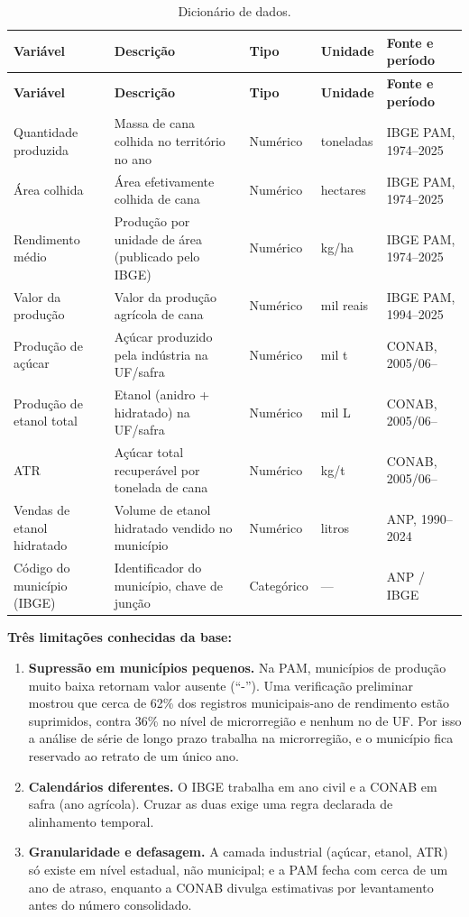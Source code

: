 \documentclass[11pt,a4paper]{article}
\begin{document}
\begin{longtable}{L{3.4cm} L{5.4cm} L{1.8cm} L{2.0cm} L{2.4cm}}
\caption{Dicionário de dados.}\label{tab:dicionario}\\
\toprule
\textbf{Variável} & \textbf{Descrição} & \textbf{Tipo} & \textbf{Unidade} & \textbf{Fonte e período}\\
\midrule
\endfirsthead
\toprule
\textbf{Variável} & \textbf{Descrição} & \textbf{Tipo} & \textbf{Unidade} & \textbf{Fonte e período}\\
\midrule
\endhead
\bottomrule
\endfoot
Quantidade produzida & Massa de cana colhida no território no ano & Numérico & toneladas & IBGE PAM, 1974–2025\\
\addlinespace
Área colhida & Área efetivamente colhida de cana & Numérico & hectares & IBGE PAM, 1974–2025\\
\addlinespace
Rendimento médio & Produção por unidade de área (publicado pelo IBGE) & Numérico & kg/ha & IBGE PAM, 1974–2025\\
\addlinespace
Valor da produção & Valor da produção agrícola de cana & Numérico & mil reais & IBGE PAM, 1994–2025\\
\addlinespace
Produção de açúcar & Açúcar produzido pela indústria na UF/safra & Numérico & mil t & CONAB, 2005/06–\\
\addlinespace
Produção de etanol total & Etanol (anidro + hidratado) na UF/safra & Numérico & mil L & CONAB, 2005/06–\\
\addlinespace
ATR & Açúcar total recuperável por tonelada de cana & Numérico & kg/t & CONAB, 2005/06–\\
\addlinespace
Vendas de etanol hidratado & Volume de etanol hidratado vendido no município & Numérico & litros & ANP, 1990–2024\\
\addlinespace
Código do município (IBGE) & Identificador do município, chave de junção & Categórico & --- & ANP / IBGE\\
\end{longtable}

\textbf{Três limitações conhecidas da base:}
\begin{enumerate}
  \item \textbf{Supressão em municípios pequenos.} Na PAM, municípios de produção muito baixa
  retornam valor ausente (``-''). Uma verificação preliminar mostrou que cerca de 62\% dos
  registros municipais-ano de rendimento estão suprimidos, contra 36\% no nível de microrregião
  e nenhum no de UF. Por isso a análise de série de longo prazo trabalha na microrregião, e o
  município fica reservado ao retrato de um único ano.
  \item \textbf{Calendários diferentes.} O IBGE trabalha em ano civil e a CONAB em safra (ano
  agrícola). Cruzar as duas exige uma regra declarada de alinhamento temporal.
  \item \textbf{Granularidade e defasagem.} A camada industrial (açúcar, etanol, ATR) só
  existe em nível estadual, não municipal; e a PAM fecha com cerca de um ano de atraso,
  enquanto a CONAB divulga estimativas por levantamento antes do número consolidado.
\end{enumerate}
\end{document}
